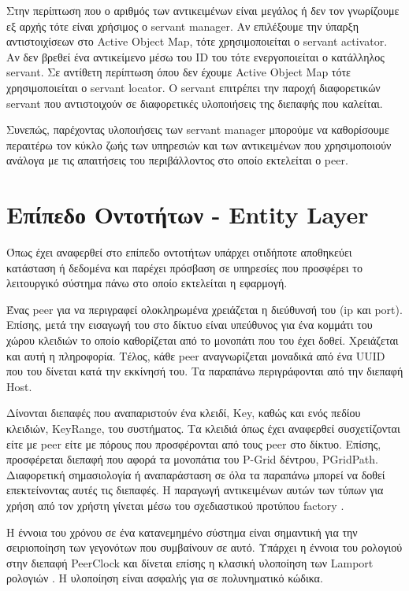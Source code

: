 Στην περίπτωση που ο αριθμός των αντικειμένων είναι μεγάλος ή δεν τον 
γνωρίζουμε εξ αρχής τότε είναι χρήσιμος ο servant manager. Αν επιλέξουμε 
την ύπαρξη αντιστοιχίσεων στο Active Object Map, τότε χρησιμοποιείται ο 
servant activator. Αν δεν βρεθεί ένα αντικείμενο μέσω του ID του τότε 
ενεργοποιείται ο κατάλληλος servant. Σε αντίθετη περίπτωση όπου δεν 
έχουμε Active Object Map τότε χρησιμοποιείται ο servant locator. Ο 
servant επιτρέπει την παροχή διαφορετικών servant που αντιστοιχούν σε 
διαφορετικές υλοποιήσεις της διεπαφής που καλείται.

Συνεπώς, παρέχοντας υλοποιήσεις των servant manager μπορούμε να 
καθορίσουμε περαιτέρω τον κύκλο ζωής των υπηρεσιών και των αντικειμένων 
που χρησιμοποιούν ανάλογα με τις απαιτήσεις του περιβάλλοντος στο οποίο 
εκτελείται ο peer.

\section{Επίπεδο Οντοτήτων - Entity Layer}

Όπως έχει αναφερθεί στο επίπεδο οντοτήτων υπάρχει οτιδήποτε 
αποθηκεύει κατάσταση ή δεδομένα και παρέχει πρόσβαση σε υπηρεσίες που 
προσφέρει το λειτουργικό σύστημα πάνω στο οποίο εκτελείται η εφαρμογή.

Ένας peer για να περιγραφεί ολοκληρωμένα χρειάζεται η διεύθυνσή 
του (ip και port). Επίσης, μετά την εισαγωγή του στο δίκτυο είναι 
υπεύθυνος για ένα κομμάτι του χώρου κλειδιών το οποίο καθορίζεται από το 
μονοπάτι που του έχει δοθεί. Χρειάζεται και αυτή η πληροφορία. Τέλος, 
κάθε peer αναγνωρίζεται μοναδικά από ένα UUID που του δίνεται κατά την 
εκκίνησή του. Τα παραπάνω περιγράφονται από την διεπαφή Host.

Δίνονται διεπαφές που αναπαριστούν ένα κλειδί, Key, καθώς και ενός 
πεδίου κλειδιών, KeyRange, του συστήματος. Τα κλειδιά όπως έχει 
αναφερθεί συσχετίζονται είτε με peer είτε με πόρους που προσφέρονται από 
τους peer στο δίκτυο. Επίσης, προσφέρεται διεπαφή που αφορά τα μονοπάτια 
του P-Grid δέντρου, PGridPath. Διαφορετική σημασιολογία ή αναπαράσταση 
σε όλα τα παραπάνω μπορεί να δοθεί επεκτείνοντας αυτές τις διεπαφές. Η 
παραγωγή αντικειμένων αυτών των τύπων για χρήση από τον χρήστη γίνεται 
μέσω του σχεδιαστικού προτύπου factory \citep{GoF}.

Η έννοια του χρόνου σε ένα κατανεμημένο σύστημα είναι σημαντική για την 
σειριοποίηση των γεγονότων που συμβαίνουν σε αυτό. Υπάρχει η έννοια του 
ρολογιού στην διεπαφή PeerClock και δίνεται επίσης η κλασική υλοποίηση 
των Lamport ρολογιών \citep{Lamport}. Η υλοποίηση είναι ασφαλής για σε 
πολυνηματικό κώδικα.

